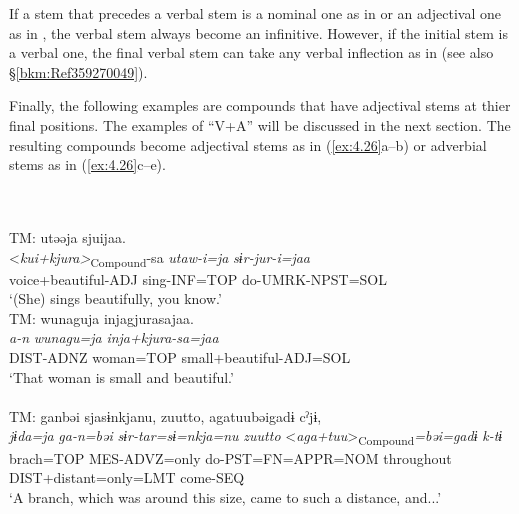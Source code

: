 \noindent If a stem that precedes a verbal stem is a nominal one as in  or an adjectival one as in , the verbal stem always become an infinitive. However, if the initial stem is a verbal one, the final verbal stem can take any verbal inflection as in  (see also §\ref{bkm:Ref359270049}).

Finally, the following examples are compounds that have adjectival stems at thier final positions. The examples of “V+A” will be discussed in the next section. The resulting compounds become adjectival stems as in (\ref{ex:4.26}a--b) or adverbial stems as in (\ref{ex:4.26}c--e).

\ea\label{ex:4.26}
\hfill\relax[Co: 120415\_00.txt]\\\label{ex:4.26a}
\\
 {TM:}  {utəəja} {sjuijaa.}\\
  {<\textit{kui+kjura>}\textsubscript{Compound}\textit{}-sa} {\itshape utaw-i=ja} {\itshape sɨr-jur-i=jaa}\\
  {voice+beautiful-ADJ} {sing-INF=TOP} {do-UMRK-NPST=SOL}\\
  \glt{} ‘(She) sings beautifully, you know.’
\hfill\relax[El: 130812]\\\label{ex:4.26b}
  {TM:}  {wunaguja} {injagjurasajaa.}\\
  {\itshape a-n} {\itshape wunagu=ja} {\itshape inja+kjura-sa=jaa}\\
  {DIST-ADNZ} {woman=TOP} {small+beautiful-ADJ=SOL}\\
  \glt{} ‘That woman is small and beautiful.’
\hfill\relax[Co: 111113\_02.txt]\\\label{ex:4.26c}
\\
 {TM:}  {ganbəi} {sjasɨnkjanu,} {{\textbar}zuutto{\textbar},} {agatuubəigadɨ} {cˀjɨ,}\\
  {\itshape jɨda=ja} {\itshape ga-n=bəi} {\itshape sɨr-tar=sɨ=nkja=nu} {\itshape zuutto} {<\textit{aga+tuu}>\textsubscript{Compound}\textit{=bəi=gadɨ}} {\itshape k-tɨ}\\
  {brach=TOP} {MES-ADVZ=only} {do-PST=FN=APPR=NOM} {throughout} {DIST+distant=only=LMT} {come-SEQ}\\
  \glt{} ‘A branch, which was around this size, came to such a distance, and...’
